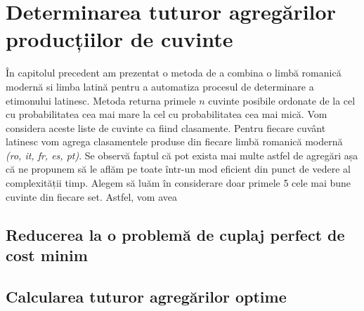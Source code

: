 \section{Determinarea tuturor agregărilor producțiilor de cuvinte}
În capitolul precedent am prezentat o metoda de a combina o limbă romanică modernă si limba latină
pentru a automatiza procesul de determinare a etimonului latinesc. Metoda returna primele $n$
cuvinte posibile ordonate de la cel cu probabilitatea cea mai mare la cel cu probabilitatea cea mai
mică. Vom considera aceste liste de cuvinte ca fiind clasamente. Pentru fiecare cuvânt latinesc vom
agrega clasamentele produse din fiecare limbă romanică modernă \textit{(ro, it, fr, es, pt)}.
Se observă faptul că pot exista mai multe astfel de agregări așa că ne propunem să le aflăm pe toate
într-un mod eficient din punct de vedere al complexității timp. Alegem să luăm în considerare
doar primele 5 cele mai bune cuvinte din fiecare set. Astfel, vom avea 



\subsection{Reducerea la o problemă de cuplaj perfect de cost minim}
\subsection{Calcularea tuturor agregărilor optime}
